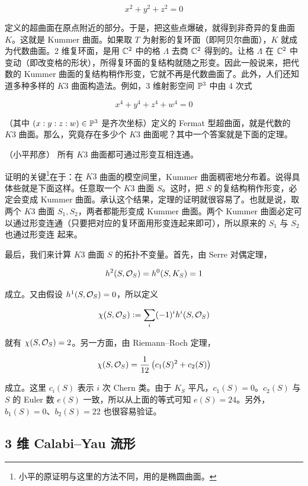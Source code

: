 \[
  x^2 + y^2 + z^2 = 0
\]

定义的超曲面在原点附近的部分。于是，把这些点爆破，就得到非奇异的复曲面 $K$。这就是 Kummer 曲面。如果取 $T$ 为射影的复环面（即阿贝尔曲面），$K$ 就成为代数曲面。2 维复环面，是用 $\mathbb{C}^2$ 中的格 $\Lambda$ 去商 $\mathbb{C}^2$ 得到的。让格 $\Lambda$ 在 $\mathbb{C}^2$ 中变动（即改变格的形状），所得复环面的复结构就随之形变。因此一般说来，把代数的 Kummer 曲面的复结构稍作形变，它就不再是代数曲面了。此外，人们还知道多种多样的 $K3$ 曲面构造法。例如，3 维射影空间 $\mathbb{P}^3$ 中由 4 次式

\[
  x^4 + y^4 + z^4 + w^4 = 0
\]

（其中 $(x:y:z:w) \in \mathbb{P}^3$ 是齐次坐标）定义的 Fermat 型超曲面，就是代数的 $K3$ 曲面。那么，究竟存在多少个 $K3$ 曲面呢？其中一个答案就是下面的定理。

\begin{theorem*}{（小平邦彦）}
  所有 $K3$ 曲面都可通过形变互相连通。
\end{theorem*}

证明的关键\footnote{小平的原证明与这里的方法不同，用的是椭圆曲面。}在于：在 $K3$ 曲面的模空间里，Kummer 曲面稠密地分布着。说得具体些就是下面这样。任意取一个 $K3$ 曲面 $S$。这时，把 $S$ 的复结构稍作形变，必定会变成 Kummer 曲面。承认这个结果，定理的证明就很容易了。也就是说，取两个 $K3$ 曲面 $S_1, S_2$，两者都能形变成 Kummer 曲面。两个 Kummer 曲面必定可以通过形变连通（只要把对应的复环面用形变连起来即可），所以原来的 $S_1$ 与 $S_2$ 也通过形变连
起来。%

最后，我们来计算 $K3$ 曲面 $S$ 的拓扑不变量。首先，由 Serre 对偶定理，

\[
  h^2(S,\mathcal{O}_S) = h^0(S,K_S) = 1
\]

成立。又由假设 $h^1(S,\mathcal{O}_S) = 0$，所以定义

\[
  \chi(S,\mathcal{O}_S) := \sum_i (-1)^i h^i(S,\mathcal{O}_S)
\]

就有 $\chi(S,\mathcal{O}_S) = 2$。另一方面，由 Riemann--Roch 定理，

\[
  \chi(S,\mathcal{O}_S) = \frac{1}{12}\left(c_1(S)^2 + c_2(S)\right)
\]

成立。这里 $c_i(S)$ 表示 $i$ 次 Chern 类。由于 $K_S$ 平凡，$c_1(S) = 0$。$c_2(S)$ 与 $S$ 的 Euler 数 $e(S)$ 一致，所以从上面的等式可知 $e(S) = 24$。另外，$b_1(S) = 0$、$b_2(S) = 22$ 也很容易验证。

\subsection*{3 维 Calabi--Yau 流形}

